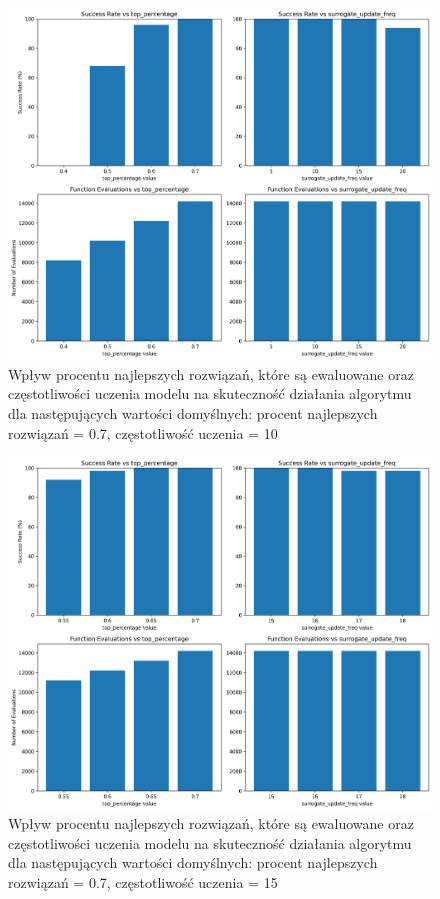 \documentclass{article}
\begin{document}
\begin{figure}[H]
    \centering
    \includegraphics[width=\textwidth]{surrogate_de_parameter_tuning_results2.png}
    \caption{Wpływ procentu najlepszych rozwiązań, które są ewaluowane oraz częstotliwości uczenia modelu na skuteczność działania algorytmu dla następujących wartości domyślnych: procent najlepszych rozwiązań = 0.7, częstotliwość uczenia = 10}
    \label{fig:surogate_de_parameter_results2}
\end{figure}

\begin{figure}[H]
    \centering
    \includegraphics[width=\textwidth]{surrogate_de_parameter_tuning_results3.png}
    \caption{Wpływ procentu najlepszych rozwiązań, które są ewaluowane oraz częstotliwości uczenia modelu na skuteczność działania algorytmu dla następujących wartości domyślnych: procent najlepszych rozwiązań = 0.7, częstotliwość uczenia = 15}
    \label{fig:surogate_de_parameter_results3}
\end{figure}
\end{document}
